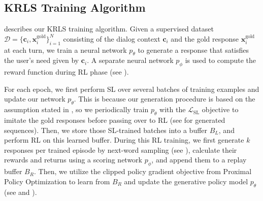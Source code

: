 \subsection{KRLS Training Algorithm}
\label{sec:KRLS Training Algorithm}
 describes our KRLS training algorithm. Given a supervised dataset $\mathcal{D}=\{\mathbf{c}_{i}, \mathbf{x}_i^{\mathrm{gold}}\}_{i=1}^N$ consisting of the dialog context $\mathbf{c}_{i}$ and the gold response $\mathbf{x}_i^{\mathrm{gold}}$ at each turn, we train a neural network $p_\theta$ to generate a response that satisfies the user's need given by $\mathbf{c}_{i}$. A separate neural network $p_\phi$ is used to compute the reward function during RL phase (see ).

For each epoch, we first perform SL over several batches of training examples and update our network $p_\theta$. This is because our generation procedure is based on the assumption stated in , so we periodically train $p_\theta$ with the $\mathcal{L}_{\mathrm{SL}}$ objective to imitate the gold responses before passing over to RL (see  for generated sequences). Then, we store those SL-trained batches into a buffer $B_L$, and perform RL on this learned buffer. During this RL training, we first generate $k$ responses per trained episode by next-word sampling (see ), calculate their rewards and returns using a scoring network $p_\phi$, and append them to a replay buffer $B_R$. Then, we utilize the clipped policy gradient objective from Proximal Policy Optimization \cite{PPO} to learn from $B_R$ and update the generative policy model $p_\theta$ (see  and ).

